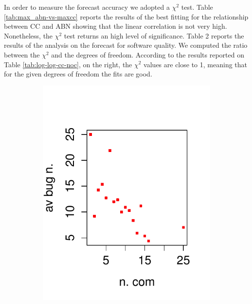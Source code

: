 In order to measure the forecast accuracy we adopted a $\chi^2$ test.
Table \ref{tab:max_abn-vs-maxcc} reports the results of the best fitting for the relationship between CC and ABN showing that the linear correlation is not very high. 
Nonetheless, the $\chi^2$ test returns an high level of significance.
Table 2 %
reports the results of the analysis on the forecast for software quality. 
We computed the ratio between the $\chi^2$ and the degrees of freedom. 
According to the results reported on Table \ref{tab:log-log-cc-noc}, on the right, the 
$\chi^2$ values are close to 1, meaning that for the given degrees of 
freedom the fits are good.

\begin{figure}
        \centering
        \begin{subfigure}%
        {0.3\textwidth}
                \includegraphics[width=\textwidth]{figure/EC_BUG_power_law-eps-converted-to.pdf}

\end{subfigure}
\end{figure}
